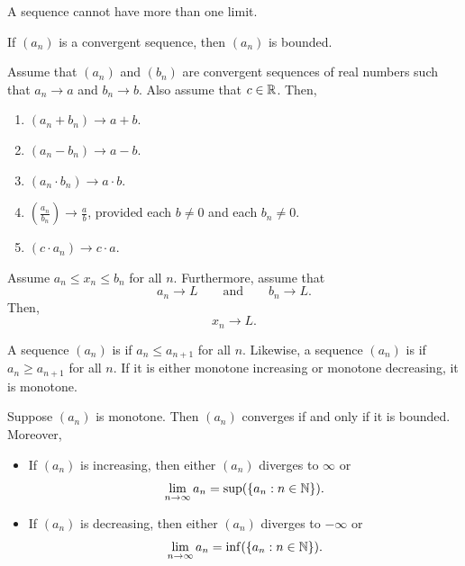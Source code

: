 \documentclass[11pt,twoside=off,numbers=noenddot]{scrbook}
\begin{document}
\begin{proposition}
  A sequence cannot have more than one limit.
\end{proposition}

\begin{proposition}
  If $(a_n)$ is a convergent sequence, then $(a_n)$ is bounded.
\end{proposition}

\begin{theorem}
  Assume that $(a_n)$ and $(b_n)$ are convergent sequences of real
  numbers such that $a_n \to a$ and $b_n \to b$. Also assume that $c
  \in \mathbb R$. Then,
  \begin{enumerate}
    \item $(a_n + b_n) \to a + b$.
    \item $(a_n - b_n) \to a - b$.
    \item $(a_n \cdot b_n) \to a \cdot b$.
    \item $(\frac{a_n}{b_n}) \to \frac{a}{b}$, provided each $b \neq
      0$ and each $b_n \neq 0$.
    \item $(c \cdot a_n) \to c \cdot a$.
  \end{enumerate}
\end{theorem}

\begin{theorem}
  Assume $a_n \leq x_n \leq b_n$ for all $n$. Furthermore, assume that
  \[ a_n \to L \qquad \text{and} \qquad b_n \to L. \]
  Then,
  \[ x_n \to L. \]
\end{theorem}

\begin{definition}
  A sequence $(a_n)$ is  if $a_n \leq a_{n
  + 1}$ for all $n$. Likewise, a sequence $(a_n)$ is  if $a_n \geq a_{n + 1}$ for all $n$. If it is either
  monotone increasing or monotone decreasing, it is monotone.
\end{definition}

\begin{theorem}
  Suppose $(a_n)$ is monotone. Then $(a_n)$ converges if and only if
  it is bounded. Moreover,
  \begin{itemize}
    \item If $(a_n)$ is increasing, then either $(a_n)$ diverges to $\infty$ or
      \[ \lim_{n \to \infty} a_n = \sup(\{ a_n : n \in \mathbb N \}). \]
    \item If $(a_n)$ is decreasing, then either $(a_n)$ diverges to $-\infty$ or
      \[ \lim_{n \to \infty} a_n = \inf(\{ a_n : n \in \mathbb N \}). \]
  \end{itemize}
\end{theorem}
\end{document}
